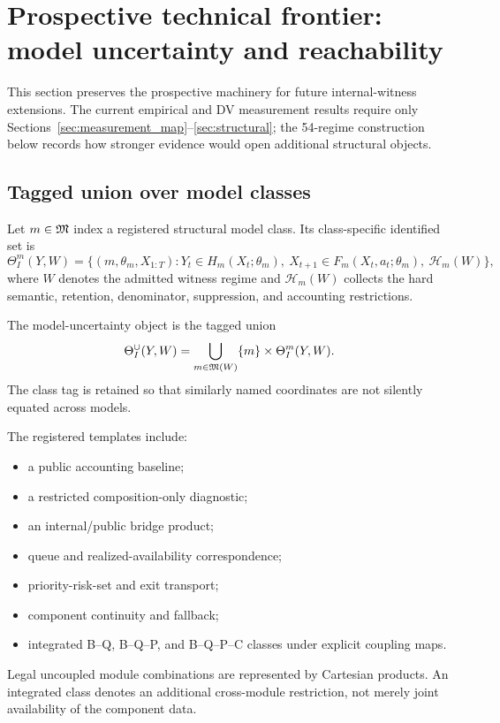 \documentclass[11pt]{article}
\begin{document}
\section{Prospective technical frontier: model uncertainty and reachability}
\label{sec:frontier}

This section preserves the prospective machinery for future internal-witness extensions. The current empirical and DV measurement results require only Sections~\ref{sec:measurement_map}--\ref{sec:structural}; the 54-regime construction below records how stronger evidence would open additional structural objects.

\subsection{Tagged union over model classes}

Let $m\in\mathfrak{M}$ index a registered structural model class. Its class-specific identified set is
\begin{equation}
\Theta_I^m(Y,W)=
\{(m,\theta_m,X_{1:T}):
Y_t\in H_m(X_t;\theta_m),\
X_{t+1}\in F_m(X_t,a_t;\theta_m),\
\mathcal H_m(W)\},
\end{equation}
where $W$ denotes the admitted witness regime and $\mathcal H_m(W)$ collects the hard semantic, retention, denominator, suppression, and accounting restrictions.

The model-uncertainty object is the tagged union
\begin{equation}
\Theta_I^{\cup}(Y,W)
=\bigcup_{m\in\mathfrak{M}(W)}\{m\}\times\Theta_I^m(Y,W).
\label{eq:taggedunion}
\end{equation}
The class tag is retained so that similarly named coordinates are not silently equated across models.

The registered templates include:
\begin{itemize}
\item a public accounting baseline;
\item a restricted composition-only diagnostic;
\item an internal/public bridge product;
\item queue and realized-availability correspondence;
\item priority-risk-set and exit transport;
\item component continuity and fallback;
\item integrated B--Q, B--Q--P, and B--Q--P--C classes under explicit coupling maps.
\end{itemize}
Legal uncoupled module combinations are represented by Cartesian products. An integrated class denotes an additional cross-module restriction, not merely joint availability of the component data.
\end{document}

